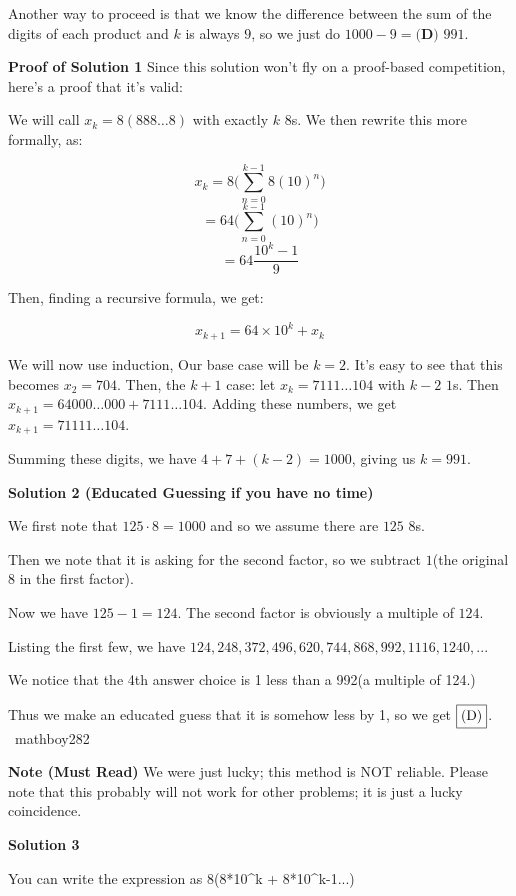 \begin{enumerate}
 Another way to proceed is that we know the difference between the sum of the digits of each product and $k$ is always $9$, so we just do $1000-9=\boxed{\textbf{(D) } 991}$.

 \textbf{Proof of Solution 1} Since this solution won't fly on a proof-based competition, here's a proof that it's valid:

 We will call $x_k=8(888\dots8)$ with exactly $k$ $8$s. We then rewrite this more formally, as:

 
 \[x_k=8\biggr(\sum_{n=0}^{k-1}8(10)^n\biggr)\]
 \[=64\biggr(\sum_{n=0}^{k-1}(10)^n\biggr)\]
 \[=64\frac{10^{k}-1}{9}\]

 Then, finding a recursive formula, we get:

 
 \[x_{k+1}=64\times 10^{k}+x_k\]

 We will now use induction, Our base case will be $k=2$. It's easy to see that this becomes $x_2=704$. Then, the $k+1$ case: let $x_k=7111\dots104$ with $k-2$ $1$s. Then $x_{k+1}=64000\dots000+7111\dots104$. Adding these numbers, we get $x_{k+1}=71111\dots104$. 

 Summing these digits, we have $4+7+(k-2)=1000$, giving us $k=991$.

 



\textbf{Solution 2 (Educated Guessing if you have no time)}

We first note that $125 \cdot 8 = 1000$ and so we assume there are $125$ 8s.

 Then we note that it is asking for the second factor, so we subtract $1$(the original $8$ in the first factor).

 Now we have $125-1=124.$ The second factor is obviously a multiple of $124$.

 Listing the first few, we have $124, 248, 372, 496, 620, 744, 868, 992, 1116, 1240, ...$

 We notice that the 4th answer choice is 1 less than a 992(a multiple of 124.)

 Thus we make an educated guess that it is somehow less by 1, so we get $\fbox{(D)}$. ~mathboy282

 \textbf{Note (Must Read)} We were just lucky; this method is NOT reliable. Please note that this probably will not work for other problems; it is just a lucky coincidence.

 



\textbf{Solution 3}

You can write the expression as 8(8*10\textasciicircum{}k + 8*10\textasciicircum{}k-1...)


\end{enumerate}
